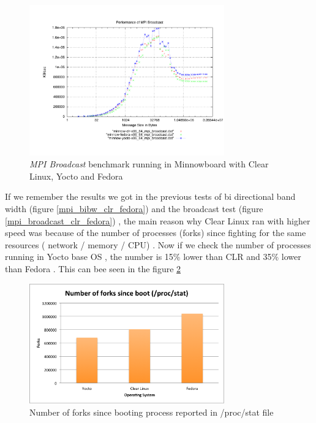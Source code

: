 \begin{figure}[H]
\centering
\includegraphics[width=0.75\textwidth]{images/mpbench_yocto_experiments/mpi_broadcast.pdf}
\caption{\textit{MPI Broadcast} benchmark running in Minnowboard with Clear Linux, Yocto
and Fedora }
\label{mpi_broadcast_yocto}
\end{figure}

If we remember the results we got in the previous tests of bi directional band
width (figure \ref{mpi_bibw_clr_fedora}) and the broadcast test (figure
\ref{mpi_broadcast_clr_fedora}) , the main reason why Clear Linux ran with
higher speed was because of the number of processes (forks) since fighting for
the same resources ( network / memory / CPU) . Now if we check the number of
processes running in Yocto base OS , the number is 15\% lower than CLR and 35\%
lower than Fedora . This can bee seen in the figure \ref{number_forks_yocto}

\begin{figure}[H]
\centering
\includegraphics[width=0.75\textwidth]{images/number_forks_yocto.png}
\caption{Number of forks since booting process reported in /proc/stat file }
\label{number_forks_yocto}
\end{figure}

